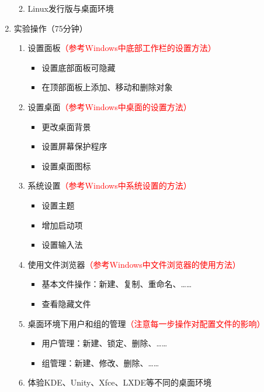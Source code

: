 \documentclass{TIJMUjiaoanSY}
\begin{document}
\begin{enumerate}
\begin{enumerate}
\begin{itemize}
	\end{itemize}
      \item Linux发行版与桌面环境
    \end{enumerate}
  \item 实验操作（75分钟）
    \begin{enumerate}
      \item 设置面板\textcolor{red}{（参考Windows中底部工作栏的设置方法）}
	\begin{itemize}
	  \item 设置底部面板可隐藏
	  \item 在顶部面板上添加、移动和删除对象
	\end{itemize}
      \item 设置桌面\textcolor{red}{（参考Windows中桌面的设置方法）}
	\begin{itemize}
	  \item 更改桌面背景
	  \item 设置屏幕保护程序
	  \item 设置桌面图标
	\end{itemize}
      \item 系统设置\textcolor{red}{（参考Windows中系统设置的方法）}
	\begin{itemize}
	  \item 设置主题
	  \item 增加启动项
	  \item 设置输入法
	\end{itemize}
      \item 使用文件浏览器\textcolor{red}{（参考Windows中文件浏览器的使用方法）}
	\begin{itemize}
	  \item 基本文件操作：新建、复制、重命名、……
	  \item 查看隐藏文件
	\end{itemize}
      \item 桌面环境下用户和组的管理\textcolor{red}{（注意每一步操作对配置文件的影响）}
	\begin{itemize}
	  \item 用户管理：新建、锁定、删除、……
	  \item 组管理：新建、修改、删除、……
	\end{itemize}
      \item 体验KDE、Unity、Xfce、LXDE等不同的桌面环境
    \end{enumerate}
\end{enumerate}


\otherTail
\end{document}

